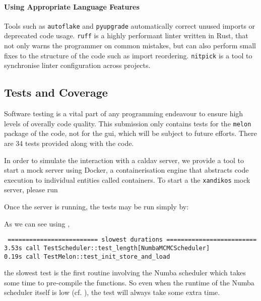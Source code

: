 \paragraph{Using Appropriate Language Features}
Tools such as \texttt{autoflake} and \texttt{pyupgrade} automatically correct unused imports or deprecated code usage.
\texttt{ruff} is a highly performant linter written in Rust, that not only warns the programmer on common mistakes, but can also perform small fixes to the structure of the code such as import reordering.
\texttt{nitpick} is a tool to synchronise linter configuration across projects.

\subsection{Tests and Coverage}
Software testing is a vital part of any programming endeavour to ensure high levels of overally code quality.
This submission only contains tests for the \texttt{melon} package of the code, not for the \gls{gui}, which will be subject to future efforts.
There are 34 tests provided along with the code.

In order to simulate the interaction with a \gls{caldav} server, we provide a tool to start a mock server using Docker, a containerisation engine that abstracts code execution to individual entities called containers.
To start a the \texttt{xandikos} mock server, please run


Once the server is running, the tests may be run simply by:


As we can see using ,

\texttt{
  ========================= slowest durations ========================= \\
  3.53s call TestScheduler::test\_length[NumbaMCMCScheduler] \\
  0.19s call TestMelon::test\_init\_store\_and\_load
}

the slowest test is the first routine involving the Numba scheduler which takes some time to pre-compile the functions.
So even when the runtime of the Numba scheduler itself is low (cf. ), the test will always take some extra time.

